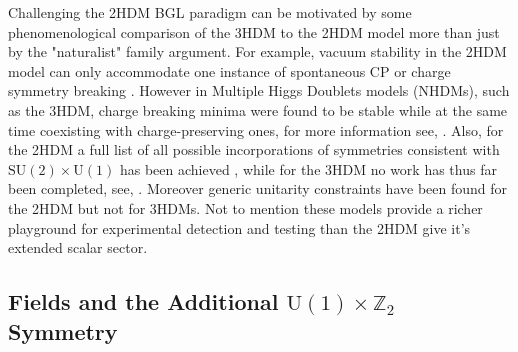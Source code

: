 Challenging the 2HDM BGL paradigm can be motivated by some phenomenological comparison of the 3HDM to the 2HDM model more than just by the "naturalist" family argument.
%
For example, vacuum stability in the 2HDM model can only accommodate one instance of spontaneous CP or charge symmetry breaking \cite{Branco_2012,Ferreira_2004,Barroso_2007}. 
%
However in Multiple Higgs Doublets models (NHDMs), such as the 3HDM, charge breaking minima were found to be stable while at the same time coexisting with charge-preserving ones, for more information see, \cite{Barroso_2006}.   
%
Also, for the 2HDM a full list of all possible incorporations of symmetries consistent with $\mathrm{SU(2)}\times\mathrm{U(1)}$ has been achieved \cite{Ivanov_2008,Ivanov2007}, while for the 3HDM no work has thus far been completed, see, \cite{Ivanov_2012,Ivanov_2015}. 
%
Moreover generic unitarity constraints have been found for the 2HDM \cite{Ginzburg_2005} but not for 3HDMs. 
%
Not to mention these models provide a richer playground for experimental detection and testing than the 2HDM give it's extended scalar sector. 

\subsection{Fields and the Additional $\mathrm{U(1)}\times\mathbb{Z}_2$ Symmetry}

